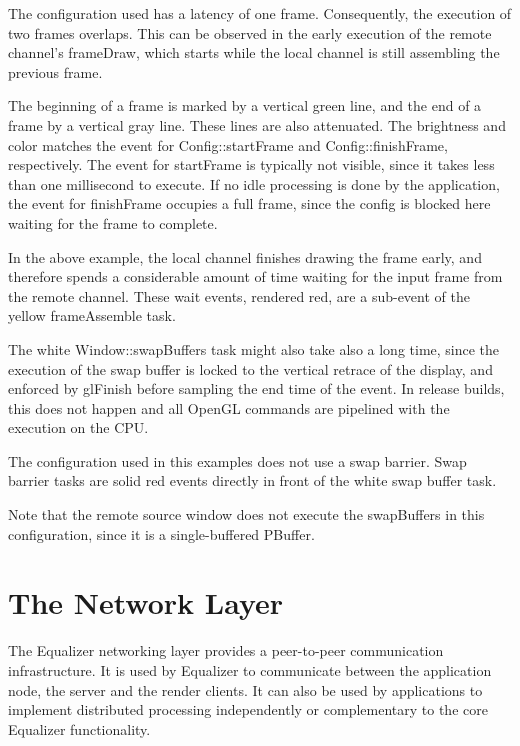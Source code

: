 \documentclass[10pt,a4]{scrartcl}
\begin{document}
The configuration used has a latency of one frame. Consequently, the
execution of two frames overlaps. This can be observed in the early
execution of the remote channel's \textsf{frameDraw}, which starts while
the local channel is still assembling the previous frame.

The beginning of a frame is marked by a vertical green line, and the end
of a frame by a vertical gray line. These lines are also attenuated. The
brightness and color matches the event for \textsf{Config::startFrame}
and \textsf{Config::finishFrame}, respectively. The event for
\textsf{startFrame} is typically not visible, since it takes less than
one millisecond to execute. If no idle processing is done by the
application, the event for \textsf{finishFrame} occupies a full frame,
since the config is blocked here waiting for the frame to complete.

In the above example, the local channel finishes drawing the frame
early, and therefore spends a considerable amount of time waiting for
the input frame from the remote channel. These wait events, rendered
red, are a sub-event of the yellow \textsf{frameAssemble} task.

The white \textsf{Window::swapBuffers} task might also take also a long
time, since the execution of the swap buffer is locked to the vertical
retrace of the display, and enforced by \textsf{glFinish} before
sampling the end time of the event. In release builds, this does not
happen and all OpenGL commands are pipelined with the execution on the
CPU.

The configuration used in this examples does not use a swap
barrier. Swap barrier tasks are solid red events directly in front of
the white swap buffer task.

Note that the remote source window does not execute the swapBuffers in
this configuration, since it is a single-buffered PBuffer.



\section{\label{sNetwork}The Network Layer}

The Equalizer networking layer provides a peer-to-peer communication
infrastructure. It is used by Equalizer to communicate between the
application node, the server and the render clients. It can also be
used by applications to implement distributed processing independently
or complementary to the core Equalizer functionality.
\end{document}

